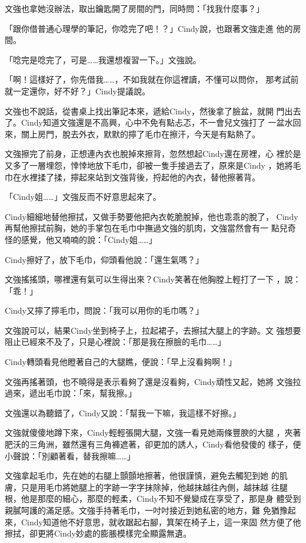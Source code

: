 文強也拿她沒辦法，取出鑰匙開了房間的門，同時問：「找我什麼事？」

「跟你借普通心理學的筆記，你唸完了吧！？」Cindy說，也跟著文強走進
他的房間。

「唸完是唸完了，可是……我還想複習一下。」文強說。

「啊！這樣好了，你先借我……，不如我就在你這裡讀，不懂可以問你，
那考試前就一定還你，好不好？」Cindy提議說。

文強也不說話，從書桌上找出筆記本來，遞給Cindy，然後拿了臉盆，就開
門出去了。Cindy知道文強還是不高興，心中不免有點忐忑，不一會兒文強打了
一盆水回來，關上房門，脫去外衣，默默的擰了毛巾在擦汗，今天是有點熱了。

文強擦完了前身，正想連內衣也脫掉來擦背，忽然想起Cindy還在房裡，心
裡於是又多了一層埋怨，悻悻地放下毛巾，卻被一隻手接過去了，原來是Cindy
，她將毛巾在水裡揉了揉，擰起來站到文強背後，捋起他的內衣，替他擦著背。

「Cindy姐……」文強反而不好意思起來了。

Cindy細細地替他擦拭，又做手勢要他把內衣乾脆脫掉，他也乖乖的脫了，
Cindy再幫他擦拭前胸，她的手掌包在毛巾中撫過文強的肌肉，文強當然會有一
點兒奇怪的感覺，他又喃喃的說：「Cindy姐……」

Cindy擦好了，放下毛巾，仰頭看他說：「還生氣嗎？」

文強搖搖頭，哪裡還有氣可以生得出來？Cindy笑著在他胸膛上輕打了一下
，說：「乖！」

Cindy又擰了擰毛巾，問說：「我可以用你的毛巾嗎？」

文強說可以，結果Cindy坐到椅子上，拉起裙子，去擦拭大腿上的字跡。文
強想要阻止已經來不及了，只是心裡說：「那是我在擦臉的毛巾……」

Cindy轉頭看見他瞪著自己的大腿瞧，便說：「早上沒看夠啊！」

文強再搖著頭，也不曉得是表示看夠了還是沒看夠，Cindy頑性又起，她將
文強拉過來，遞出毛巾說：「來，幫我擦。」

文強還以為聽錯了，Cindy又說：「幫我一下嘛，我這樣不好擦。」

文強就傻傻地蹲下來，Cindy輕輕張開大腿，文強一看見她兩條豐腴的大腿
，夾著肥沃的三角洲，雖然還有三角褲遮著，卻更加的誘人，Cindy看他發傻的
樣子，便小聲說：「別顧著看，替我擦嘛……」

文強拿起毛巾，先在她的右腿上顫顫地擦著，他很謹慎，避免去觸犯到她
的肌膚，只是用毛巾將她腿上的字跡一字字抹除掉，他越抹越往內側，越抹越
往腿根，他是那麼的細心，那麼的輕柔，Cindy不知不覺變成在享受了，那是身
體受到親膩呵護的滿足感。文強手持著毛巾，一吋吋接近到她私密的地方，難
免猶豫起來，Cindy知道他不好意思，就收踞起右腳，箕架在椅子上，這一來固
然方便了他擦拭，卻更將Cindy妙處的膨脹模樣完全顯露無遺。

